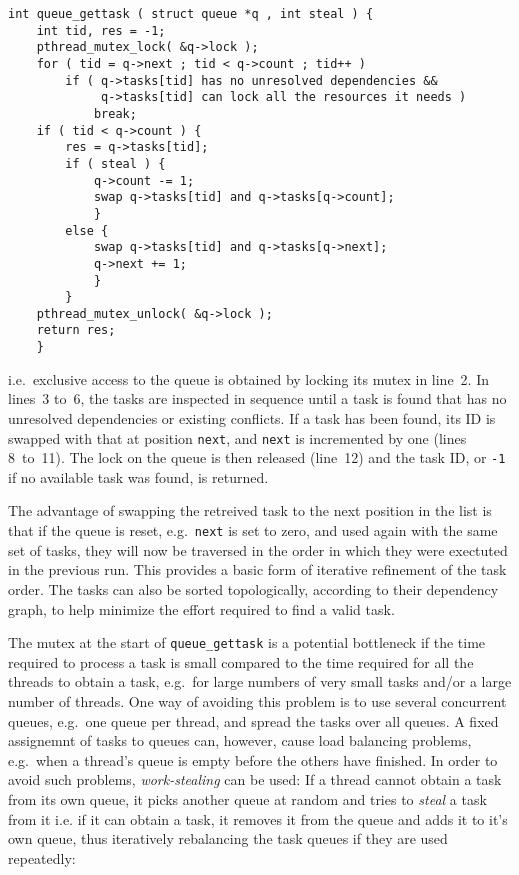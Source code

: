 \documentclass[final]{siamltex}
\begin{document}
\begin{center}\begin{minipage}{0.8\textwidth}
    \begin{lstlisting}
int queue_gettask ( struct queue *q , int steal ) {
    int tid, res = -1;
    pthread_mutex_lock( &q->lock );
    for ( tid = q->next ; tid < q->count ; tid++ )
        if ( q->tasks[tid] has no unresolved dependencies &&
             q->tasks[tid] can lock all the resources it needs )
            break;
    if ( tid < q->count ) {
        res = q->tasks[tid];
        if ( steal ) {
            q->count -= 1;
            swap q->tasks[tid] and q->tasks[q->count];
            }
        else {
            swap q->tasks[tid] and q->tasks[q->next];
            q->next += 1;
            }
        }
    pthread_mutex_unlock( &q->lock );
    return res;
    }
    \end{lstlisting}
\end{minipage}\end{center}

\noindent i.e.~exclusive access to the queue is obtained by locking
its mutex in line~2. In lines~3 to~6, the tasks are inspected
in sequence until a task is found that has no unresolved
dependencies or existing conflicts.
If a task has been found, its ID is swapped with that at
position {\tt next}, and {\tt next} is incremented by one
(lines 8~to~11).
The lock on the queue is then released (line~12) and
the task ID, or {\tt -1} if no available task was found, is
returned.

The advantage of swapping the retreived task to the next
position in the list is that if the queue is reset, e.g.~{\tt next}
is set to zero, and used again with the same set of tasks,
they will now be traversed in the order in which they were
exectuted in the previous run.
This provides a basic form of iterative refinement of the task
order.
The tasks can also be sorted topologically, according to their
dependency graph, to help minimize the effort required to find
a valid task.

The mutex at the start of {\tt queue\_gettask} is a potential
bottleneck if the time required to process a task is small
compared to the time required for all the threads to obtain
a task, e.g.~for large numbers of very small tasks and/or
a large number of threads.
One way of avoiding this problem is to use several concurrent
queues, e.g.~one queue per thread, and spread the tasks over
all queues.
A fixed assignemnt of tasks to queues can, however,
cause load balancing problems, e.g.~when a thread's queue is
empty before the others have finished.
In order to avoid such problems, {\em work-stealing} can be used:
If a thread cannot obtain a task from its own queue, it picks
another queue at random and tries to {\em steal} a task from it
i.e. if it can obtain a task, it removes it from the queue and
adds it to it's own queue, thus iteratively rebalancing
the task queues if they are used repeatedly:
\end{document}
